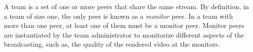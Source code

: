 
\label{sec:team_def}

A team is a set of one or more peers that share the same stream. By
definition, in a team of size one, the only peer is known as a
\emph{monitor} peer. In a team with more than one peer, at least one
of them must be a monitor peer. Monitor peers are instantiated by the
team administrator to monitorize different aspects of the
broadcasting, such as, the quality of the rendered video at the
monitors.
